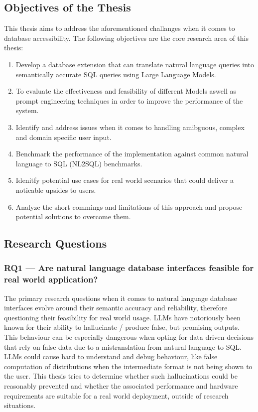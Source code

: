 \documentclass{article}
\begin{document}
\subsection{Objectives of the Thesis}

This thesis aims to address the aforementioned challanges when it comes to database accessibility.
The following objectives are the core research area of this thesis:

\begin{enumerate}
    \item Develop a database extension that can translate natural language queries into semantically
          accurate SQL queries using Large Language Models.
    \item To evaluate the effectiveness and feasibility of different Models aswell as prompt engineering
          techniques in order to improve the performance of the system.
    \item Identify and address issues when it comes to handling amibguous, complex and domain specific user input.
    \item Benchmark the performance of the implementation against common natural language to SQL (NL2SQL) benchmarks.
    \item Idenitfy potential use cases for real world scenarios that could deliver a noticable upsides to users.
    \item Analyze the short commings and limitations of this approach and propose potential solutions to overcome them.
\end{enumerate}  

\subsection{Research Questions}


\subsubsection*{RQ1 — Are natural language database interfaces feasible for real world application?}

The primary research questions when it comes to natural language database interfaces evolve around their
semantic accuracy and reliability, therefore questioning their feasibility for real world usage.
LLMs have notoriously been known for their ability to hallucinate / produce false, but promising outputs.
This behaviour can be especially  dangerous when opting for data driven decisions that rely on false data
due to a mistranslation from natural language to SQL. LLMs could cause hard to understand and debug behaviour,
like false computation of distributions when the intermediate format is not being shown to the user. This
thesis tries to determine whether such hallucinations could be reasonably prevented and whether the associated
performance and hardware requirements are suitable for a real world deployment, outside of research situations.
\end{document}
